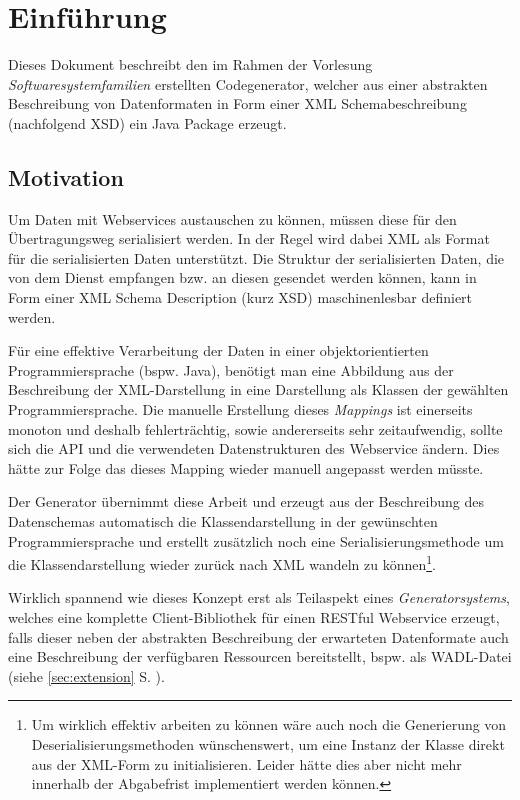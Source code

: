 \section{Einführung}

Dieses Dokument beschreibt den im Rahmen der Vorlesung \emph{Softwaresystemfamilien} erstellten Codegenerator, welcher aus einer abstrakten Beschreibung von Datenformaten in Form einer \gls{XML} Schemabeschreibung (nachfolgend \gls{XSD}) ein Java Package erzeugt.

\subsection{Motivation}
\label{sec:motivation}

Um Daten mit Webservices austauschen zu können, müssen diese für den Übertragungsweg serialisiert werden. In der Regel wird dabei \gls{XML} als Format für die serialisierten Daten unterstützt. Die Struktur der serialisierten Daten, die von dem Dienst empfangen bzw. an diesen gesendet werden können, kann in Form einer XML Schema Description (kurz \gls{XSD}) maschinenlesbar definiert werden.

Für eine effektive Verarbeitung der Daten in einer objektorientierten Programmiersprache (bspw. Java), benötigt man eine Abbildung aus der Beschreibung der XML-Darstellung in eine Darstellung als Klassen der gewählten Programmiersprache. Die manuelle Erstellung dieses \emph{Mappings} ist einerseits monoton und deshalb fehlerträchtig, sowie andererseits sehr zeitaufwendig, sollte sich die API und die verwendeten Datenstrukturen des Webservice ändern. Dies hätte zur Folge das dieses Mapping wieder manuell angepasst werden müsste.

Der Generator übernimmt diese Arbeit und erzeugt aus der Beschreibung des Datenschemas automatisch die Klassendarstellung in der gewünschten Programmiersprache und erstellt zusätzlich noch eine Serialisierungsmethode um die Klassendarstellung wieder zurück nach \gls{XML} wandeln zu können\footnote{Um wirklich effektiv arbeiten zu können wäre auch noch die Generierung von Deserialisierungsmethoden wünschenswert, um eine Instanz der Klasse direkt aus der \gls{XML}-Form zu initialisieren. Leider hätte dies aber nicht mehr innerhalb der Abgabefrist implementiert werden können.}.

Wirklich spannend wie dieses Konzept erst als Teilaspekt eines \emph{Generatorsystems}, welches eine komplette Client-Bibliothek für einen \gls{RESTful} Webservice erzeugt, falls dieser neben der abstrakten Beschreibung der erwarteten Datenformate auch eine Beschreibung der verfügbaren Ressourcen bereitstellt, bspw. als \gls{WADL}-Datei (siehe \cref{sec:extension} S. \pageref{sec:extension}).

